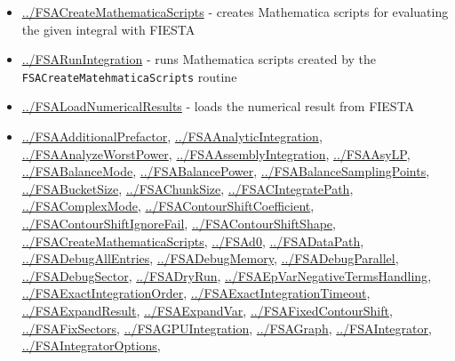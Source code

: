\documentclass[../FeynHelpersManual.tex]{subfiles}
\begin{document}
\begin{itemize}
\tightlist
\item
  \hyperlink{../fsacreatemathematicascripts}{../FSACreateMathematicaScripts}
  - creates Mathematica scripts for evaluating the given integral with
  FIESTA
\item
  \hyperlink{../fsarunintegration}{../FSARunIntegration} - runs
  Mathematica scripts created by the
  \texttt{FSACreateMatehmaticaScripts} routine
\item
  \hyperlink{../fsaloadnumericalresults}{../FSALoadNumericalResults} -
  loads the numerical result from FIESTA
\item
  \hyperlink{../fsaadditionalprefactor}{../FSAAdditionalPrefactor},
  \hyperlink{../fsaanalyticintegration}{../FSAAnalyticIntegration},
  \hyperlink{../fsaanalyzeworstpower}{../FSAAnalyzeWorstPower},
  \hyperlink{../fsaassemblyintegration}{../FSAAssemblyIntegration},
  \hyperlink{../fsaasylp}{../FSAAsyLP},
  \hyperlink{../fsabalancemode}{../FSABalanceMode},
  \hyperlink{../fsabalancepower}{../FSABalancePower},
  \hyperlink{../fsabalancesamplingpoints}{../FSABalanceSamplingPoints},
  \hyperlink{../fsabucketsize}{../FSABucketSize},
  \hyperlink{../fsachunksize}{../FSAChunkSize},
  \hyperlink{../fsacintegratepath}{../FSACIntegratePath},
  \hyperlink{../fsacomplexmode}{../FSAComplexMode},
  \hyperlink{../fsacontourshiftcoefficient}{../FSAContourShiftCoefficient},
  \hyperlink{../fsacontourshiftignorefail}{../FSAContourShiftIgnoreFail},
  \hyperlink{../fsacontourshiftshape}{../FSAContourShiftShape},
  \hyperlink{../fsacreatemathematicascripts}{../FSACreateMathematicaScripts},
  \hyperlink{../fsad0}{../FSAd0},
  \hyperlink{../fsadatapath}{../FSADataPath},
  \hyperlink{../fsadebugallentries}{../FSADebugAllEntries},
  \hyperlink{../fsadebugmemory}{../FSADebugMemory},
  \hyperlink{../fsadebugparallel}{../FSADebugParallel},
  \hyperlink{../fsadebugsector}{../FSADebugSector},
  \hyperlink{../fsadryrun}{../FSADryRun},
  \hyperlink{../fsaepvarnegativetermshandling}{../FSAEpVarNegativeTermsHandling},
  \hyperlink{../fsaexactintegrationorder}{../FSAExactIntegrationOrder},
  \hyperlink{../fsaexactintegrationtimeout}{../FSAExactIntegrationTimeout},
  \hyperlink{../fsaexpandresult}{../FSAExpandResult},
  \hyperlink{../fsaexpandvar}{../FSAExpandVar},
  \hyperlink{../fsafixedcontourshift}{../FSAFixedContourShift},
  \hyperlink{../fsafixsectors}{../FSAFixSectors},
  \hyperlink{../fsagpuintegration}{../FSAGPUIntegration},
  \hyperlink{../fsagraph}{../FSAGraph},
  \hyperlink{../fsaintegrator}{../FSAIntegrator},
  \hyperlink{../fsaintegratoroptions}{../FSAIntegratorOptions},

\end{itemize}
\end{document}
